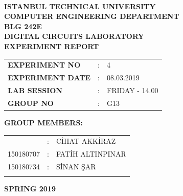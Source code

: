 \documentclass[pdftex,12pt,a4paper]{article}
\begin{document}
\begin{titlepage}
\begin{center}
\textbf{}\\
\textbf{\Large{ISTANBUL TECHNICAL UNIVERSITY}}\\
\vspace{0.5cm}
\textbf{\Large{COMPUTER ENGINEERING DEPARTMENT}}\\
\vspace{2cm}
\textbf{\Large{BLG 242E\\ DIGITAL CIRCUITS LABORATORY\\ EXPERIMENT REPORT}}\\
\vspace{2.8cm}
\begin{table}[ht]
\centering
\Large{
\begin{tabular}{lcl}
\textbf{EXPERIMENT NO}  & : & 4 \\
\textbf{EXPERIMENT DATE}  & : & 08.03.2019 \\
\textbf{LAB SESSION}  & : & FRIDAY - 14.00 \\
\textbf{GROUP NO}  & : & G13 \\
\end{tabular}}
\end{table}
\vspace{1cm}
\textbf{\Large{GROUP MEMBERS:}}\\
\begin{table}[ht]
\centering
\Large{
\begin{tabular}{rcl}{
150180704  & : & C\.{I}HAT AKK\.{I}RAZ \\
150180707  & : & FAT\.{I}H ALTINPINAR \\
150180734  & : & S\.{I}NAN \c{S}AR \\
}
\end{tabular}}
\end{table}
\vspace{2.8cm}
\textbf{\Large{SPRING 2019}}

\end{center}

\end{titlepage}

\newpage
\newpage

\thispagestyle{empty}
\setcounter{tocdepth}{4}
\tableofcontents
\clearpage
\end{document}
